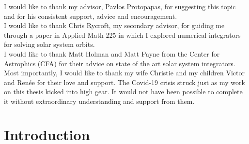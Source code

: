 \documentclass[11pt]{gsasthesis} %
\begin{document}
\renewcommand{\contentsname}{\protect\centering\protect\Large Contents}
\renewcommand{\listtablename}{\protect\centering\protect\Large List of Tables}
\renewcommand{\listfigurename}{\protect\centering\protect\Large List of Figures}

\tableofcontents %

\begin{acknowledgments}
I would like to thank my advisor, Pavlos Protopapas, for suggesting this topic and for his consistent support, advice and encouragement. \\
I would like to thank Chris Rycroft, my secondary advisor, for guiding me through a paper in Applied Math 225 in which I explored
numerical integrators for solving solar system orbits.\\
I would like to thank Matt Holman and Matt Payne from the Center for Astrophics (CFA) for their advice on state of the art solar system integrators.\\
Most importantly, I would like to thank my wife Christie and my children Victor and Ren\'ee for their love and support.
The Covid-19 crisis struck just as my work on this thesis kicked into high gear.
It would not have been possible to complete it without extraordinary understanding and support from them.
\end{acknowledgments}



\chapter*{Introduction}\label{ch:intro}

\end{document}
